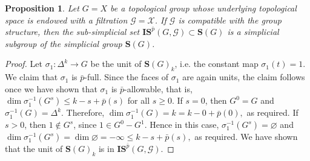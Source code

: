 \documentclass{amsart}
\newtheorem{prop}[thm]{Proposition}
\theoremstyle{definition}
\theoremstyle{remark}
\newcommand {\Ga}    {\ensuremath{\mbox{$\mathcal{G}$}}}
\newcommand {\Xa}    {\ensuremath{\mathcal{X}}}
\newcommand {\bp}    {{\ensuremath{\bar{p}}}}
\newcommand {\sS}    {\mathbf{S}}
\newcommand {\sIS}   {\mathbf{IS}}
\begin{document}
\begin{prop} \label{prop.isgissimplgrp}
Let $G=X$ be a topological group whose underlying topological space
is endowed with a filtration $\Ga = \Xa$.
If $\Ga$ is compatible with the group structure,
then the sub-simplicial set
$\sIS^\bp (G, \Ga) \subset \sS (G)$
is a simplicial subgroup of the simplicial group $\sS (G)$.
\end{prop}
\begin{proof}
Let $\sigma_1: \Delta^k \to G$ be the unit of $\sS (G)_k$, i.e.
the constant map $\sigma_1 (t)=1$. We claim that $\sigma_1$ is
$\bp$-full. Since the faces of $\sigma_1$ are again units,
the claim follows once we have shown that $\sigma_1$ is
$\bp$-allowable, that is,
$\dim \sigma^{-1}_1 (G^s) \leq k-s+\bp (s)$
for all $s\geq 0$. 
If $s=0$, then $G^0=G$ and $\sigma^{-1}_1 (G) = \Delta^k$.
Therefore,
$\dim \sigma^{-1}_1 (G) = k = k-0+\bp (0),$ as required.
If $s>0$, then $1\not\in G^s$, since $1 \in G^0 - G^1$.
Hence in this case, $\sigma^{-1}_1 (G^s) = \varnothing$ and
$\dim \sigma^{-1}_1 (G^s) = \dim \varnothing =
  -\infty \leq  k-s+\bp (s),$ as required.
We have shown that the unit of $\sS (G)_k$ is in $\sIS^\bp (G, \Ga)$.


\end{proof}
\end{document}
